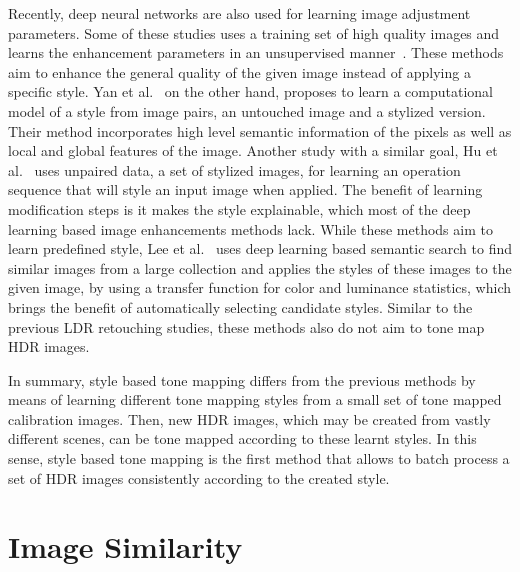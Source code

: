 
Recently, deep neural networks are also used for learning image adjustment parameters. Some of these studies uses a training set of high quality images and learns the enhancement parameters in an unsupervised manner~\cite{park2018distort, chen2018deep,ignatov2018wespe}. These methods aim to enhance the general quality of the given image instead of applying a specific style. Yan et al.~\cite{yan2016automatic} on the other hand, proposes to learn a computational model of a style from image pairs, an untouched image and a stylized version. Their method incorporates high level semantic information of the pixels as well as local and global features of the image. Another study with a similar goal, Hu et al.~\cite{hu2018exposure} uses unpaired data, a set of stylized images, for learning an operation sequence that will style an input image when applied. The benefit of learning modification steps is it makes the style explainable, which most of the deep learning based image enhancements methods lack. While these methods aim to learn predefined style, Lee et al.~\cite{lee2016automatic} uses deep learning based semantic search to find similar images from a large collection and applies the styles of these images to the given image, by using a transfer function for color and luminance statistics, which brings the benefit of automatically selecting candidate styles. Similar to the previous LDR retouching studies, these methods also do not aim to tone map HDR images.

In summary, style based tone mapping differs from the previous methods by means of learning different tone mapping styles from a small set of tone mapped calibration images. Then, new HDR images, which may be created from vastly different scenes, can be tone mapped according to these learnt styles. In this sense, style based tone mapping is the first method that allows to batch process a set of HDR images consistently according to the created style.


\section{Image Similarity}

